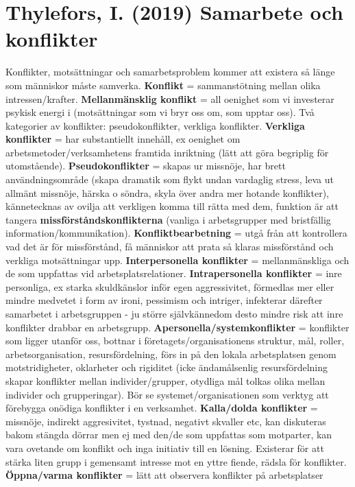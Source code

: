 \documentclass{report}
\begin{document}
	\section{Thylefors, I. (2019) Samarbete och konflikter}
	Konflikter, motsättningar och samarbetsproblem kommer att
	existera så länge som människor måste samverka. \textbf{Konflikt}
	= sammanstötning mellan olika intressen/krafter. \textbf{Mellanmänsklig
	konflikt} = all oenighet som vi investerar psykisk energi
	i (motsättningar som vi bryr oss om, som upptar oss). Två
	kategorier av konflikter: pseudokonflikter, verkliga
	konflikter. \textbf{Verkliga konflikter} = har
	substantiellt innehåll, ex oenighet om arbetsmetoder/verksamhetens
	framtida inriktning (lätt att göra begriplig för
	utomstående). \textbf{Pseudokonflikter} = skapas ur missnöje,
	har brett användningsområde (skapa dramatik som flykt undan
	vardaglig stress, leva ut allmänt missnöje, härska o söndra,
	skyla över andra mer hotande konflikter), kännetecknas av
	ovilja att verkligen komma till rätta med dem, funktion är att
	tangera \textbf{missförståndskonflikterna} (vanliga i arbetsgrupper
	med bristfällig information/kommunikation). \textbf{Konfliktbearbetning}
	= utgå från att kontrollera vad det är för missförstånd, få
	människor att prata så klaras missförstånd och verkliga motsättningar
	upp. \textbf{Interpersonella konflikter} = mellanmänskliga och
	de som uppfattas vid arbetsplatsrelationer. \textbf{Intrapersonella
	konflikter} = inre personliga, ex starka skuldkänslor
	inför egen aggressivitet, förmedlas mer eller mindre medvetet
	i form av ironi, pessimism och intriger, infekterar därefter
	samarbetet i arbetsgruppen - ju större självkännedom desto mindre
	risk att inre konflikter drabbar en arbetsgrupp. \textbf{Apersonella/systemkonflikter}
	= konflikter som ligger utanför oss, bottnar i företagets/organisationens
	struktur, mål, roller, arbetsorganisation,
	resursfördelning, förs in på den lokala arbetsplatsen genom
	motstridigheter, oklarheter och rigiditet (icke ändamålsenlig
	resursfördelning skapar konflikter mellan individer/grupper,
	otydliga mål tolkas olika mellan individer och
	grupperingar). Bör se systemet/organisationen som verktyg
	att förebygga onödiga konflikter i en verksamhet. \textbf{Kalla/dolda
	konflikter} = missnöje, indirekt aggresivitet, tystnad, negativt
	skvaller etc, kan diskuteras bakom stängda dörrar men ej
	med den/de som uppfattas som motparter, kan vara ovetande om
	konflikt och inga initiativ till en lösning. Existerar för
	att stärka liten grupp i gemensamt intresse mot en yttre
	fiende, rädsla för konflikter. \textbf{Öppna/varma
	konflikter} = lätt att observera konflikter på arbetsplatser
\end{document}
